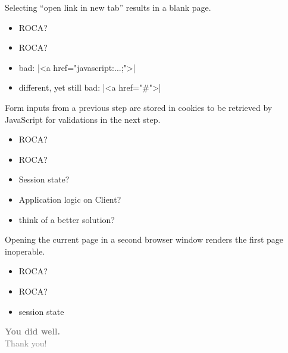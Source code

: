 \documentclass{beamer}
\newcommand{\rocafail}{\ding{55}}
\begin{document}
\begin{frame}[fragile]
  Selecting ``open link in new tab'' results in a blank page.

  \vspace{0.3cm}
  \begin{itemize}
    \item<1|only@1>[\Large $\square$] \Large ROCA?
    \item<2|only@2>[\Large \rocafail] \Large ROCA?
    \item<2> bad: |<a href="javascript:...;">|
    \item<2> different, yet still bad: |<a href="#">|
  \end{itemize}
\end{frame}

\begin{frame}
  Form inputs from a previous step are stored in cookies to be retrieved by
  JavaScript for validations in the next step.

  \vspace{0.3cm}
  \begin{itemize}
    \item<1|only@1>[\Large $\square$] \Large ROCA?
    \item<2->[\Large \rocafail] \Large ROCA?
    \item<2-> Session state?
    \item<2-> Application logic on Client?
    \item<3> think of a better solution?
  \end{itemize}

\end{frame}

\begin{frame}
  Opening the current page in a second browser window renders the first page inoperable.

  \vspace{0.3cm}
  \begin{itemize}
    \item<1|only@1>[\Large $\square$] \Large ROCA?
    \item<2->[\Large \rocafail] \Large ROCA?
    \item<2-> session state
  \end{itemize}

\end{frame}

\begin{frame}
  \vspace*{-2cm}
  \textcolor{gray}{
    \begin{center}
      \textbf{ \fontsize{50}{80} \selectfont You did well. \\ }
      {\fontsize{30}{30} \selectfont Thank you!}
    \end{center}
  }
\end{frame}
\end{document}
